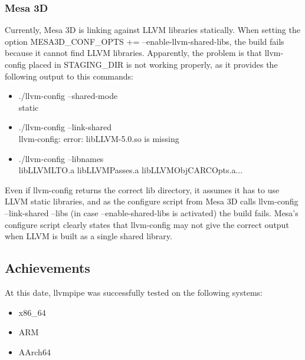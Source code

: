 \documentclass[12pt,a4paper,oneside]{article}
\begin{document}
\subsubsection*{Mesa 3D}
Currently, Mesa 3D is linking against LLVM libraries statically. When setting the
option {\selectfont MESA3D\_CONF\_OPTS += --enable-llvm-shared-libs},
the build fails because it cannot find LLVM libraries. Apparently, the problem is
that llvm-config placed in STAGING\_DIR is not working properly, as it provides
the following output to this commands:
\begin{itemize}
  \item {\selectfont./llvm-config --shared-mode\\
        static}
  \item {\selectfont./llvm-config --link-shared\\
        llvm-config: error: libLLVM-5.0.so is missing}

  \item {\selectfont./llvm-config --libnames\\
        libLLVMLTO.a libLLVMPasses.a libLLVMObjCARCOpts.a...}
\end{itemize}
Even if llvm-config returns the correct lib directory, it assumes it has to use
LLVM static libraries, and as the configure script from Mesa 3D calls
{\selectfont llvm-config --link-shared --libs} (in case
{\selectfont --enable-shared-libs} is activated) the build
fails. Mesa's configure script clearly states that llvm-config may not give
the correct output when LLVM is built as a single shared library.

\subsection*{Achievements}
At this date, llvmpipe was successfully tested on the following systems:
\begin{itemize}
  \item x86\_64
  \item ARM
  \item AArch64
\end{itemize}
\end{document}
